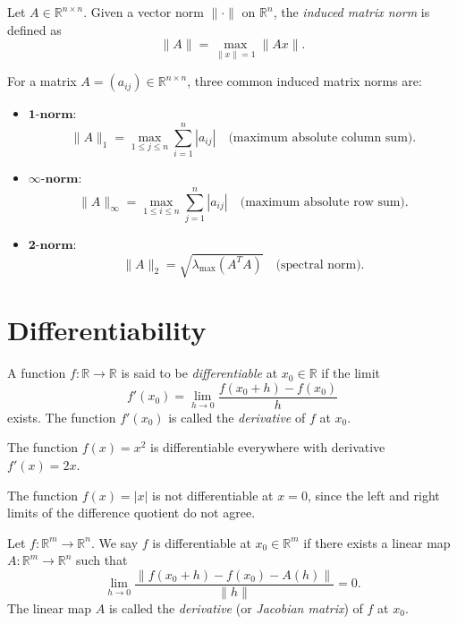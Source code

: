 \begin{definition}
Let $A \in \mathbb{R}^{n \times n}$.  
Given a vector norm $\|\cdot\|$ on $\mathbb{R}^n$, the \emph{induced matrix norm} is defined as
\[
\|A\| = \max_{\|x\|=1} \|Ax\|.
\]
\end{definition}

\begin{example}
For a matrix $A = (a_{ij}) \in \mathbb{R}^{n \times n}$, three common induced matrix norms are:
\begin{itemize}
    \item $\mathbf{1\text{-norm}}$:  
    \[
    \|A\|_1 = \max_{1 \leq j \leq n} \sum_{i=1}^n |a_{ij}| 
    \quad \text{(maximum absolute column sum)}.
    \]
    \item $\mathbf{\infty\text{-norm}}$:  
    \[
    \|A\|_\infty = \max_{1 \leq i \leq n} \sum_{j=1}^n |a_{ij}| 
    \quad \text{(maximum absolute row sum)}.
    \]
    \item $\mathbf{2\text{-norm}}$:  
    \[
    \|A\|_2 = \sqrt{\lambda_{\max}(A^TA)}
    \quad \text{(spectral norm)}.
    \]
\end{itemize}
\end{example}

\section{Differentiability}

\begin{definition}
A function $f:\mathbb{R}\to \mathbb{R}$ is said to be \emph{differentiable} at $x_0\in \mathbb{R}$ if the limit
\[
f'(x_0) = \lim_{h\to 0} \frac{f(x_0+h)-f(x_0)}{h}
\]
exists. The function $f'(x_0)$ is called the \emph{derivative} of $f$ at $x_0$.
\end{definition}

\begin{example}
The function $f(x)=x^2$ is differentiable everywhere with derivative $f'(x)=2x$.
\end{example}

\begin{example}
The function $f(x)=|x|$ is not differentiable at $x=0$, since the left and right limits of the difference quotient do not agree.
\end{example}


\begin{definition}
Let $f:\mathbb{R}^m\to \mathbb{R}^n$. We say $f$ is differentiable at $x_0\in \mathbb{R}^m$ if there exists a linear map 
$A:\mathbb{R}^m\to \mathbb{R}^n$ such that
\[
\lim_{h\to 0}\frac{\|f(x_0+h)-f(x_0)-A(h)\|}{\|h\|} = 0.
\]
The linear map $A$ is called the \emph{derivative} (or \emph{Jacobian matrix}) of $f$ at $x_0$.
\end{definition}

